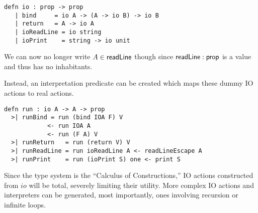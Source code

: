 \begin{lstlisting}
defn io : prop -> prop
   | bind     = io A -> (A -> io B) -> io B
   | return   = A -> io A
   | ioReadLine = io string
   | ioPrint    = string -> io unit
\end{lstlisting}

We can now no longer write $A \in \mathsf{readLine}$ though since $\mathsf{readLine} : \mathsf{prop}$ 
is a value and thus has no inhabitants. 

Instead, an interpretation predicate can be created which maps these dummy IO actions to real actions.

\begin{lstlisting}
defn run : io A -> A -> prop
  >| runBind = run (bind IOA F) V
            <- run IOA A 
            <- run (F A) V 
  >| runReturn   = run (return V) V
  >| runReadLine = run ioReadLine A <- readLineEscape A
  >| runPrint    = run (ioPrint S) one <- print S
\end{lstlisting}

Since the type system is the ``Calculus of Constructions,'' IO actions constructed
from $io$ will be total, severely limiting their utility.
More complex IO actions and interpreters can be generated, most importantly, ones involving recursion 
or infinite loops.
